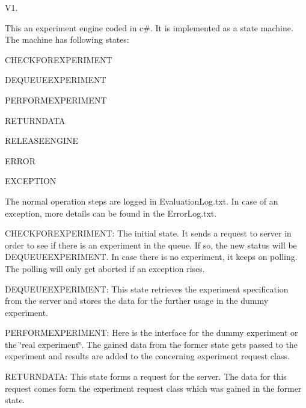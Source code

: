 V1.

\begin{DoxyParagraph}{}
This an experiment engine coded in c\#. It is implemented as a state machine. The machine has following states\+:
\begin{DoxyItemize}
\item C\+H\+E\+C\+K\+F\+O\+R\+E\+X\+P\+E\+R\+I\+M\+E\+N\+T
\item D\+E\+Q\+U\+E\+U\+E\+E\+X\+P\+E\+R\+I\+M\+E\+N\+T
\item P\+E\+R\+F\+O\+R\+M\+E\+X\+P\+E\+R\+I\+M\+E\+N\+T
\item R\+E\+T\+U\+R\+N\+D\+A\+T\+A
\item R\+E\+L\+E\+A\+S\+E\+E\+N\+G\+I\+N\+E
\item E\+R\+R\+O\+R
\item E\+X\+C\+E\+P\+T\+I\+O\+N
\end{DoxyItemize}
\end{DoxyParagraph}
\begin{DoxyParagraph}{}
The normal operation steps are logged in Evaluation\+Log.\+txt. In case of an exception, more details can be found in the Error\+Log.\+txt.
\end{DoxyParagraph}
\begin{DoxyParagraph}{}
C\+H\+E\+C\+K\+F\+O\+R\+E\+X\+P\+E\+R\+I\+M\+E\+N\+T\+: The initial state. It sends a request to server in order to see if there is an experiment in the queue. If so, the new status will be D\+E\+Q\+U\+E\+U\+E\+E\+X\+P\+E\+R\+I\+M\+E\+N\+T. In case there is no experiment, it keeps on polling. The polling will only get aborted if an exception rises.
\end{DoxyParagraph}
\begin{DoxyParagraph}{}
D\+E\+Q\+U\+E\+U\+E\+E\+X\+P\+E\+R\+I\+M\+E\+N\+T\+: This state retrieves the experiment specification from the server and stores the data for the further usage in the dummy experiment.
\end{DoxyParagraph}
\begin{DoxyParagraph}{}
P\+E\+R\+F\+O\+R\+M\+E\+X\+P\+E\+R\+I\+M\+E\+N\+T\+: Here is the interface for the dummy experiment or the \char`\"{}real experiment\char`\"{}. The gained data from the former state gets passed to the experiment and results are added to the concerning experiment request class.
\end{DoxyParagraph}
\begin{DoxyParagraph}{}
R\+E\+T\+U\+R\+N\+D\+A\+T\+A\+: This state forms a request for the server. The data for this request comes form the experiment request class which was gained in the former state.
\end{DoxyParagraph}
